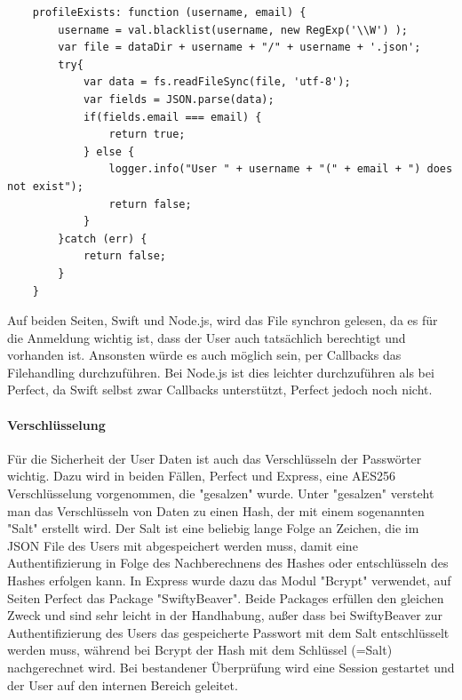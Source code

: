 
\begin{lstlisting}
    profileExists: function (username, email) {
		username = val.blacklist(username, new RegExp('\\W') );
        var file = dataDir + username + "/" + username + '.json';
        try{
            var data = fs.readFileSync(file, 'utf-8');
            var fields = JSON.parse(data);
            if(fields.email === email) {
                return true;
            } else {
				logger.info("User " + username + "(" + email + ") does not exist");
                return false;
            }
        }catch (err) {
            return false;
        }
    }
\end{lstlisting}

Auf beiden Seiten, Swift und Node.js, wird das File synchron gelesen, da es für die Anmeldung wichtig ist, dass der User auch tatsächlich berechtigt und vorhanden ist. Ansonsten würde es auch möglich sein, per Callbacks das Filehandling durchzuführen. Bei Node.js ist dies leichter durchzuführen als bei Perfect, da Swift selbst zwar Callbacks unterstützt, Perfect jedoch noch nicht. 

\paragraph{Verschlüsselung}
Für die Sicherheit der User Daten ist auch das Verschlüsseln der Passwörter wichtig. Dazu wird in beiden Fällen, Perfect und Express, eine AES256 Verschlüsselung vorgenommen, die "gesalzen" wurde. Unter "gesalzen" versteht man das Verschlüsseln von Daten zu einen Hash, der mit einem sogenannten "Salt" erstellt wird. Der Salt ist eine beliebig lange Folge an Zeichen, die im JSON File des Users mit abgespeichert werden muss, damit eine Authentifizierung in Folge des Nachberechnens des Hashes oder entschlüsseln des Hashes erfolgen kann. 
In Express wurde dazu das Modul "Bcrypt" verwendet, auf Seiten Perfect das Package "SwiftyBeaver". Beide Packages erfüllen den gleichen Zweck und sind sehr leicht in der Handhabung, außer dass bei SwiftyBeaver zur Authentifizierung des Users das gespeicherte Passwort mit dem Salt entschlüsselt werden muss, während bei Bcrypt der Hash mit dem Schlüssel (=Salt) nachgerechnet wird. Bei bestandener Überprüfung wird eine Session gestartet und der User auf den internen Bereich geleitet.

